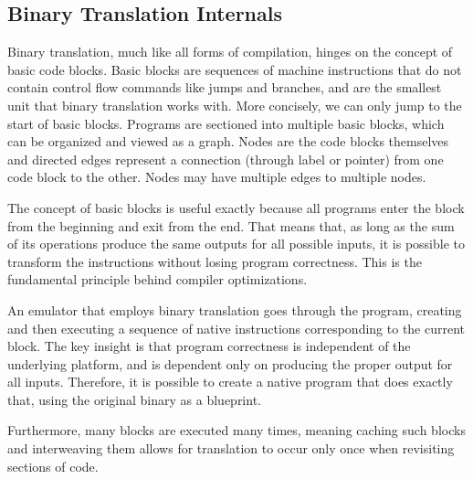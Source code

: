 \subsection{Binary Translation Internals}

Binary translation, much like all forms of compilation, hinges on the concept
of basic code blocks.  Basic blocks are sequences of machine instructions that
do not contain control flow commands like jumps and branches, and are the
smallest unit that binary translation works with.  More concisely, we can only
jump to the start of basic blocks. Programs are sectioned into multiple basic
blocks, which can be organized and viewed as a graph. Nodes are the code
blocks themselves and directed edges represent a connection (through label or pointer)
from one code block to the other.  Nodes may have multiple edges to multiple nodes.

The concept of basic blocks is useful exactly because all programs enter the 
block from the beginning and exit from the end. That means that, as long as
the sum of its operations produce the same outputs for all possible inputs,
it is possible to transform the instructions without losing program correctness.
This is the fundamental principle behind compiler optimizations.

An emulator that employs binary translation goes through the program, creating and 
then executing a sequence of native instructions corresponding to the current block.
The key insight is that program correctness is independent of the underlying
platform, and is dependent only on producing the proper output for all inputs.
Therefore, it is possible to create a native program that does exactly that, using 
the original binary as a blueprint.

Furthermore, many blocks are executed many times, meaning caching such blocks and
interweaving them allows for translation to occur only once when revisiting sections of code.


